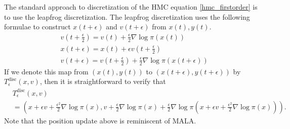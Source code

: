 \documentclass{scrartcl}
\begin{document}
The standard approach to discretization of the HMC equation
\eqref{hmc_firstorder} is to use the leapfrog discretization. The
leapfrog discretization uses the following formulae to construct
$x(t+\epsilon)$ and $v(t + \epsilon)$ from $x(t), y(t)$.
\begin{equation}
  \label{leapfrog}
  \begin{split}
&    v\left(t + \frac{\epsilon}{2}\right) = v(t) + \frac{\epsilon}{2}
  \nabla \log \pi(x(t)) \\
& x(t + \epsilon) = x(t) + \epsilon v\left(t + \frac{\epsilon}{2}
  \right) \\
& v(t + \epsilon) = v \left(t + \frac{\epsilon}{2} \right) +
  \frac{\epsilon}{2} \nabla \log \pi(x(t + \epsilon))
  \end{split}
\end{equation}
If we denote this map from $(x(t), y(t))$ to $(x(t + \epsilon), y(t +
\epsilon))$ by $T^{\text{disc}}_{\epsilon}(x, v)$, then it is straightforward to
verify that
\begin{equation}\label{leapfrog_exp}
  \begin{split}
  &T_{\epsilon}^{\text{disc}}(x, v)\\ &= \left(x + \epsilon v +
  \frac{\epsilon^2}{2} \nabla \log \pi(x), v + \frac{\epsilon}{2}
  \nabla \log \pi(x) + \frac{\epsilon}{2}\nabla \log \pi \left(x + \epsilon v +
                                        \frac{\epsilon^2}{2} \nabla
                                        \log \pi(x) \right) \right). 
  \end{split}                                        
\end{equation}
Note that the position update above is reminiscent of MALA.
\end{document}
